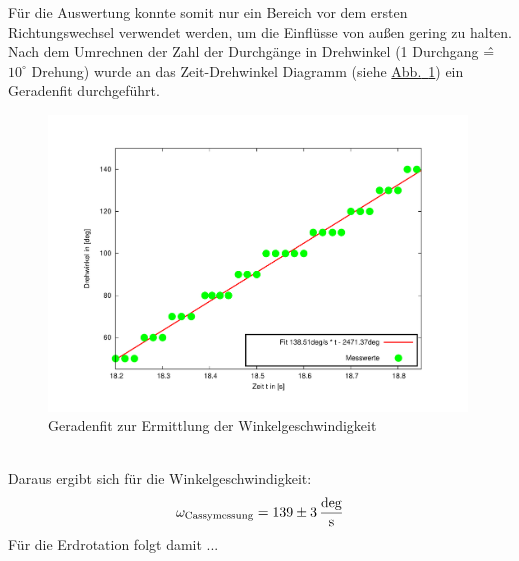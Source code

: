 \documentclass[11pt]{scrartcl}
\newcommand{\unit}[1]{\ensuremath{\,\mathrm{#1}}} %
\newcommand{\ltext}[1]{\ensuremath{_{\textnormal{#1}}}}
\newcommand{\hypref}[2]{\hyperref[#2]{{#1}~\ref{#2}}}
\begin{document}
F\"ur die Auswertung konnte somit nur ein Bereich vor dem ersten Richtungswechsel verwendet werden, um die Einfl\"usse von au\ss{}en gering zu halten. Nach dem Umrechnen der Zahl der Durchg\"ange in Drehwinkel (1 Durchgang \^{=} $10^\circ$ Drehung) wurde an das \glqq Zeit-Drehwinkel\grqq{} Diagramm (siehe \hypref{Abb.}{zeit-winkel29-cassy}) ein Geradenfit durchgef\"uhrt.
\begin{figure}[ht]
\begin{center}
\includegraphics[width=0.99\textwidth]{zeit-winkel29-cassy.pdf}
\end{center}
\vspace{-1.5\baselineskip}
\caption{Geradenfit zur Ermittlung der Winkelgeschwindigkeit}
\label{zeit-winkel29-cassy}
\end{figure}
\\Daraus ergibt sich f\"ur die Winkelgeschwindigkeit:
\begin{equation}
\omega\ltext{Cassymessung} = 139\pm 3 \unit{\frac{deg}{s}}
\end{equation}
F\"ur die Erdrotation folgt damit ...

\FloatBarrier
\end{document}
